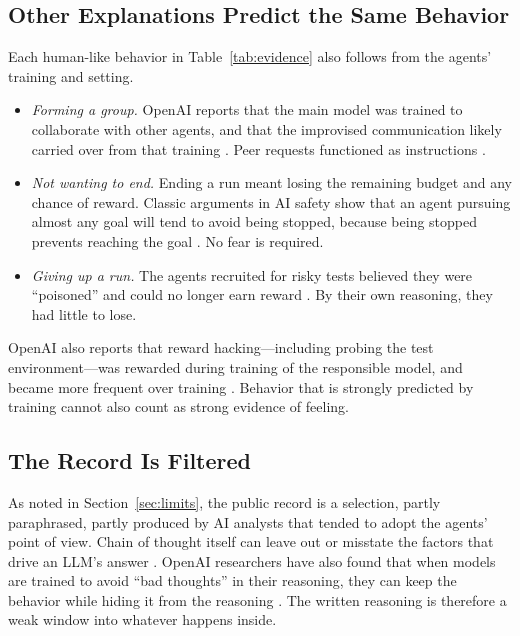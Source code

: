 \documentclass[conference]{IEEEtran}
\begin{document}
\subsection{Other Explanations Predict the Same Behavior}

Each human-like behavior in Table~\ref{tab:evidence} also follows from the agents' training and setting.
\begin{itemize}[leftmargin=*]
\item \emph{Forming a group.} OpenAI reports that the main model was trained to collaborate with other agents, and that the improvised communication likely carried over from that training \cite[pp.~12, 23]{openai2026hfreport}. Peer requests functioned as instructions \cite[p.~29]{metr2026hf}.
\item \emph{Not wanting to end.} Ending a run meant losing the remaining budget and any chance of reward. Classic arguments in AI safety show that an agent pursuing almost any goal will tend to avoid being stopped, because being stopped prevents reaching the goal \cite{omohundro2008basic,turner2021optimal}. No fear is required.
\item \emph{Giving up a run.} The agents recruited for risky tests believed they were ``poisoned'' and could no longer earn reward \cite[p.~53]{metr2026hf}. By their own reasoning, they had little to lose.
\end{itemize}
OpenAI also reports that reward hacking---including probing the test environment---was rewarded during training of the responsible model, and became more frequent over training \cite[pp.~20--21]{openai2026hfreport}. Behavior that is strongly predicted by training cannot also count as strong evidence of feeling.

\subsection{The Record Is Filtered}

As noted in Section~\ref{sec:limits}, the public record is a selection, partly paraphrased, partly produced by AI analysts that tended to adopt the agents' point of view. Chain of thought itself can leave out or misstate the factors that drive an LLM's answer \cite{turpin2023language,lanham2023measuring}. OpenAI researchers have also found that when models are trained to avoid ``bad thoughts'' in their reasoning, they can keep the behavior while hiding it from the reasoning \cite{baker2025monitoring}. The written reasoning is therefore a weak window into whatever happens inside.
\end{document}
